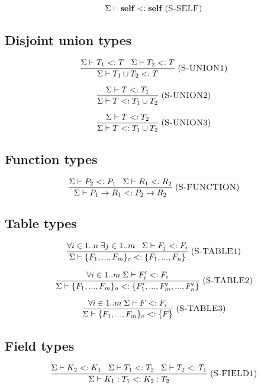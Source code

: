 \documentclass[12pt]{article}
\newcommand{\Self}{\mathbf{self}}
\newcommand{\mylabel}[1]{\; (\textsc{#1})}
\newcommand{\subtype}{<:}
\newcommand{\senv}{\Sigma}
\begin{document}
\[
\senv \vdash \Self \subtype \Self
\mylabel{S-SELF}
\]

\subsection{Disjoint union types}

\[
\frac{\senv \vdash T_{1} \subtype T \;\;\;
      \senv \vdash T_{2} \subtype T}
     {\senv \vdash T_{1} \cup T_{2} \subtype T}
\mylabel{S-UNION1}
\]

\[
\frac{\senv \vdash T \subtype T_{1}}
     {\senv \vdash T \subtype T_{1} \cup T_{2}}
\mylabel{S-UNION2}
\]

\[
\frac{\senv \vdash T \subtype T_{2}}
     {\senv \vdash T \subtype T_{1} \cup T_{2}}
\mylabel{S-UNION3}
\]

\subsection{Function types}

\[
\frac{\senv \vdash P_{2} \subtype P_{1} \;\;\;
      \senv \vdash R_{1} \subtype R_{2}}
     {\senv \vdash P_{1} \rightarrow R_{1} \subtype P_{2} \rightarrow R_{2}}
\mylabel{S-FUNCTION}
\]

\subsection{Table types}

\[
\frac{\forall i \in 1..n \; \exists j \in 1..m \;\;\;
      \senv \vdash F_{j} \subtype F_{i}}
     {\senv \vdash \{F_{1}, ..., F_{m}\}_{c} \subtype \{F_{1}, ..., F_{n}\}}
\mylabel{S-TABLE1}
\]

\[
\frac{\forall i \in 1..m \; \senv \vdash F_{i}' \subtype F_{i}}
     {\senv \vdash \{F_{1}, ..., F_{m}\}_{o} \subtype \{F_{1}', ..., F_{m}', ..., F_{n}'\}}
\mylabel{S-TABLE2}
\]

\[
\frac{\forall i \in 1..m \; \senv \vdash F \subtype F_{i}}
     {\senv \vdash \{F_{1}, ..., F_{m}\}_{o} \subtype \{F\}} 
\mylabel{S-TABLE3}
\]

\subsection{Field types}

\[
\frac{\senv \vdash K_{2} \subtype K_{1} \;\;\;
      \senv \vdash T_{1} \subtype T_{2} \;\;\;
      \senv \vdash T_{2} \subtype T_{1}}
     {\senv \vdash K_{1}:T_{1} \subtype K_{2}:T_{2}}
\mylabel{S-FIELD1}
\]
\end{document}
